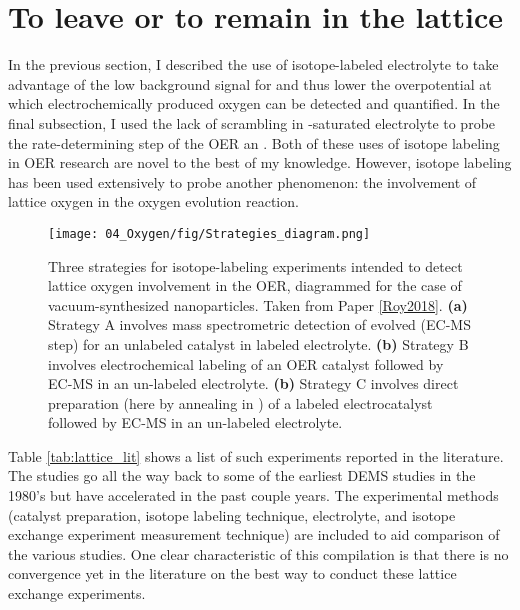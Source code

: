 

\section{To leave or to remain in the lattice}\label{sec:lattice_O}

In the previous section, I described the use of isotope-labeled electrolyte to take advantage of the low background signal for  and thus lower the overpotential at which electrochemically produced oxygen can be detected and quantified. In the final subsection, I used the lack of scrambling in -saturated  electrolyte to probe the rate-determining step of the OER an . Both of these uses of isotope labeling in OER research are novel to the best of my knowledge. However, isotope labeling has been used extensively to probe another phenomenon: the involvement of lattice oxygen in the oxygen evolution reaction. 

\begin{figure}[h!]
	\centering
	\texttt{[image: 04\_Oxygen/fig/Strategies\_diagram.png]}
	\caption{Three strategies for isotope-labeling experiments intended to detect lattice oxygen involvement in the OER, diagrammed for the case of vacuum-synthesized  nanoparticles. Taken from Paper \ref{Roy2018}. \textbf{(a)} Strategy A involves mass spectrometric detection of evolved  (EC-MS step) for an unlabeled catalyst in labeled electrolyte. \textbf{(b)} Strategy B involves electrochemical labeling of an OER catalyst followed by EC-MS in an un-labeled electrolyte. \textbf{(b)} Strategy C involves direct preparation (here by annealing in ) of a labeled electrocatalyst followed by EC-MS in an un-labeled electrolyte.}
	\label{fig:strategies}
\end{figure}



Table \ref{tab:lattice_lit} shows a list of such experiments reported in the literature. The studies go all the way back to some of the earliest DEMS studies in the 1980's but have accelerated in the past couple years. The experimental methods (catalyst preparation, isotope labeling technique, electrolyte, and isotope exchange experiment measurement technique) are included to aid comparison of the various studies. One clear characteristic of this compilation is that there is no convergence yet in the literature on the best way to conduct these lattice exchange experiments.

